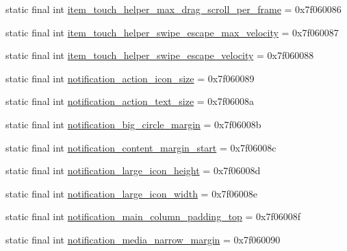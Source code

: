 \begin{DoxyCompactItemize}
\item 
static final int \mbox{\hyperlink{classandroid_1_1support_1_1v7_1_1recyclerview_1_1_r_1_1dimen_a728dd54cdbb2064930d2fe9da462edeb}{item\+\_\+touch\+\_\+helper\+\_\+max\+\_\+drag\+\_\+scroll\+\_\+per\+\_\+frame}} = 0x7f060086
\item 
static final int \mbox{\hyperlink{classandroid_1_1support_1_1v7_1_1recyclerview_1_1_r_1_1dimen_ac379d2745cb9cf4ae5ef9d2c4eecd7bc}{item\+\_\+touch\+\_\+helper\+\_\+swipe\+\_\+escape\+\_\+max\+\_\+velocity}} = 0x7f060087
\item 
static final int \mbox{\hyperlink{classandroid_1_1support_1_1v7_1_1recyclerview_1_1_r_1_1dimen_a3921e54ecd29bea8852f97f3aedf5d4e}{item\+\_\+touch\+\_\+helper\+\_\+swipe\+\_\+escape\+\_\+velocity}} = 0x7f060088
\item 
static final int \mbox{\hyperlink{classandroid_1_1support_1_1v7_1_1recyclerview_1_1_r_1_1dimen_afc1527a16a48922054f23e1694271a1d}{notification\+\_\+action\+\_\+icon\+\_\+size}} = 0x7f060089
\item 
static final int \mbox{\hyperlink{classandroid_1_1support_1_1v7_1_1recyclerview_1_1_r_1_1dimen_a1f6407e81bc3ef63d572333d7cdfd045}{notification\+\_\+action\+\_\+text\+\_\+size}} = 0x7f06008a
\item 
static final int \mbox{\hyperlink{classandroid_1_1support_1_1v7_1_1recyclerview_1_1_r_1_1dimen_ad66ffce85781b53d0cbd7ec256d993a2}{notification\+\_\+big\+\_\+circle\+\_\+margin}} = 0x7f06008b
\item 
static final int \mbox{\hyperlink{classandroid_1_1support_1_1v7_1_1recyclerview_1_1_r_1_1dimen_a57931a75a2932abe9b050285d641a184}{notification\+\_\+content\+\_\+margin\+\_\+start}} = 0x7f06008c
\item 
static final int \mbox{\hyperlink{classandroid_1_1support_1_1v7_1_1recyclerview_1_1_r_1_1dimen_a990d167b178817607fd529af92c06629}{notification\+\_\+large\+\_\+icon\+\_\+height}} = 0x7f06008d
\item 
static final int \mbox{\hyperlink{classandroid_1_1support_1_1v7_1_1recyclerview_1_1_r_1_1dimen_a20645c38e40951f47d501058cfb90835}{notification\+\_\+large\+\_\+icon\+\_\+width}} = 0x7f06008e
\item 
static final int \mbox{\hyperlink{classandroid_1_1support_1_1v7_1_1recyclerview_1_1_r_1_1dimen_a9b1a7cf41560031012ea4255b1e2d6bf}{notification\+\_\+main\+\_\+column\+\_\+padding\+\_\+top}} = 0x7f06008f
\item 
static final int \mbox{\hyperlink{classandroid_1_1support_1_1v7_1_1recyclerview_1_1_r_1_1dimen_a2e265c18af5b779bdaaa7abcbc73d574}{notification\+\_\+media\+\_\+narrow\+\_\+margin}} = 0x7f060090

\end{DoxyCompactItemize}
